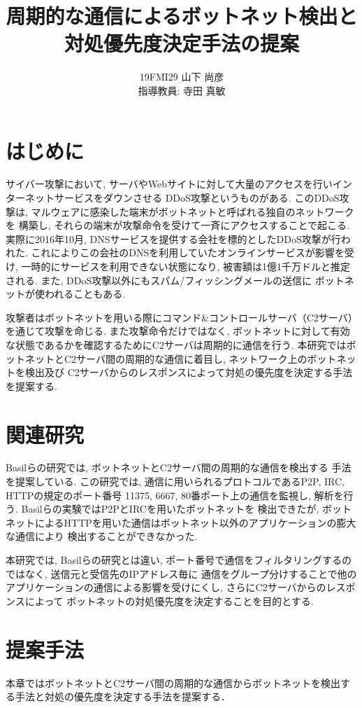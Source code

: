 \documentclass[twocolumn,9]{ltjsarticle}
\title{周期的な通信によるボットネット検出と対処優先度決定手法の提案}
\author{19FMI29 山下 尚彦 \\ 指導教員: 寺田 真敏}
\date{}
\begin{document}
\maketitle

\section{はじめに}
サイバー攻撃において, サーバやWebサイトに対して大量のアクセスを行いインターネットサービスをダウンさせる
DDoS攻撃というものがある. このDDoS攻撃は, マルウェアに感染した端末がボットネットと呼ばれる独自のネットワークを
構築し, それらの端末が攻撃命令を受けて一斉にアクセスすることで起こる. 
実際に2016年10月, DNSサービスを提供する会社を標的としたDDoS攻撃が行われた. 
これによりこの会社のDNSを利用していたオンラインサービスが影響を受け, 一時的にサービスを利用できない状態になり, 
被害額は1億1千万ドルと推定される. また, DDoS攻撃以外にもスパム/フィッシングメールの送信に
ボットネットが使われることもある. 

攻撃者はボットネットを用いる際にコマンド\&コントロールサーバ（C2サーバ）を通じて攻撃を命じる. 
また攻撃命令だけではなく, ボットネットに対して有効な状態であるかを確認するためにC2サーバは周期的に通信を行う. 
本研究ではボットネットとC2サーバ間の周期的な通信に着目し, ネットワーク上のボットネットを検出及び
C2サーバからのレスポンスによって対処の優先度を決定する手法を提案する. 

\section{関連研究}
Basilらの研究\cite{assadhan2018analysis}では, ボットネットとC2サーバ間の周期的な通信を検出する
手法を提案している. この研究では, 通信に用いられるプロトコルであるP2P, IRC, HTTPの規定のポート番号
11375, 6667, 80番ポート上の通信を監視し, 解析を行う. Basilらの実験ではP2PとIRCを用いたボットネットを
検出できたが, ボットネットによるHTTPを用いた通信はボットネット以外のアプリケーションの膨大な通信により
検出することができなかった. 

本研究では, Basilらの研究とは違い, ポート番号で通信をフィルタリングするのではなく, 送信元と受信先のIPアドレス毎に
通信をグループ分けすることで他のアプリケーションの通信による影響を受けにくし, さらにC2サーバからのレスポンスによって
ボットネットの対処優先度を決定することを目的とする. 

\section{提案手法}
本章ではボットネットとC2サーバ間の周期的な通信からボットネットを検出する手法と対処の優先度を決定する手法を提案する．
\end{document}
